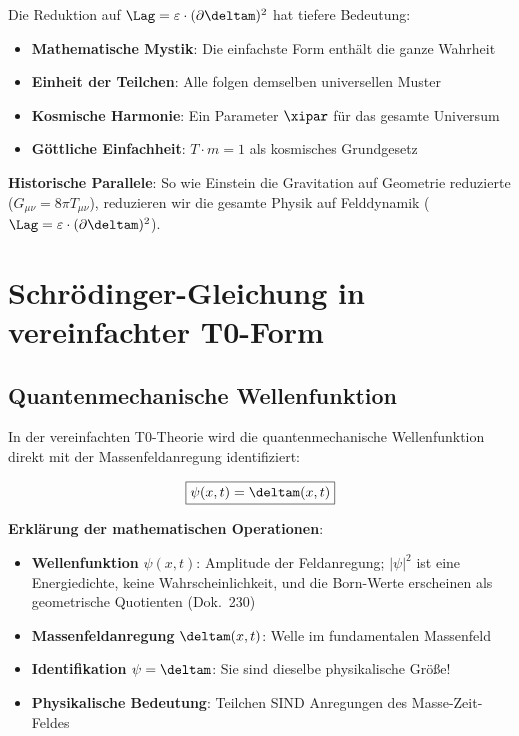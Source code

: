 	Die Reduktion auf $\Lag = \varepsilon \cdot (\partial \deltam)^2$ hat tiefere Bedeutung:
	
	\begin{itemize}
		\item \textbf{Mathematische Mystik}: Die einfachste Form enthält die ganze Wahrheit
		\item \textbf{Einheit der Teilchen}: Alle folgen demselben universellen Muster
		\item \textbf{Kosmische Harmonie}: Ein Parameter $\xipar$ für das gesamte Universum
		\item \textbf{Göttliche Einfachheit}: $T \cdot m = 1$ als kosmisches Grundgesetz
	\end{itemize}
	
	\textbf{Historische Parallele}: So wie Einstein die Gravitation auf Geometrie reduzierte ($G_{\mu\nu} = 8\pi T_{\mu\nu}$), reduzieren wir die gesamte Physik auf Felddynamik ($\Lag = \varepsilon \cdot (\partial \deltam)^2$).
	
	\section{Schrödinger-Gleichung in vereinfachter T0-Form}
	
	\subsection{Quantenmechanische Wellenfunktion}
	
	In der vereinfachten T0-Theorie wird die quantenmechanische Wellenfunktion direkt mit der Massenfeldanregung identifiziert:
	
	\begin{equation}
		\boxed{\psi(x,t) = \deltam(x,t)}
		\label{eq:wavefunction_identification}
	\end{equation}
	
	\textbf{Erklärung der mathematischen Operationen}:
	\begin{itemize}
		\item \textbf{Wellenfunktion} $\psi(x,t)$: Amplitude der Feldanregung; $|\psi|^2$ ist eine Energiedichte, keine Wahrscheinlichkeit, und die Born-Werte erscheinen als geometrische Quotienten (Dok.~230)
		\item \textbf{Massenfeldanregung} $\deltam(x,t)$: Welle im fundamentalen Massenfeld
		\item \textbf{Identifikation} $\psi = \deltam$: Sie sind dieselbe physikalische Größe!
		\item \textbf{Physikalische Bedeutung}: Teilchen SIND Anregungen des Masse-Zeit-Feldes
	\end{itemize}
	

